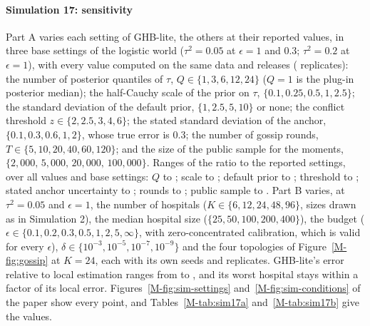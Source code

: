 \documentclass[acmsmall,screen,nonacm]{acmart}
\theoremstyle{acmdefinition}
\begin{document}
\paragraph{Simulation 17: sensitivity} Part A varies each setting of GHB-lite, the others at their reported values, in three base settings of the logistic world ($\tau^2=0.05$ at $\epsilon=1$ and $0.3$; $\tau^2=0.2$ at $\epsilon=1$), with every value computed on the same data and releases (\SimSeventeenReps{} replicates): the number of posterior quantiles of $\tau$, $Q\in\{1,3,6,12,24\}$ ($Q=1$ is the plug-in posterior median); the half-Cauchy scale of the prior on $\tau$, $\{0.1,0.25,0.5,1,2.5\}$; the standard deviation of the default prior, $\{1,2.5,5,10\}$ or none; the conflict threshold $z\in\{2,2.5,3,4,6\}$; the stated standard deviation of the anchor, $\{0.1,0.3,0.6,1,2\}$, whose true error is 0.3; the number of gossip rounds, $T\in\{5,10,20,40,60,120\}$; and the size of the public sample for the moments, $\{2{,}000,\,5{,}000,\,20{,}000,\,100{,}000\}$. Ranges of the ratio to the reported settings, over all values and base settings: $Q$ \SimSeventeenQMin{} to \SimSeventeenQMax; scale \SimSeventeenScaleMin{} to \SimSeventeenScaleMax; default prior \SimSeventeenPriorMin{} to \SimSeventeenPriorMax; threshold \SimSeventeenZMin{} to \SimSeventeenZMax; stated anchor uncertainty \SimSeventeenAnchorSdMin{} to \SimSeventeenAnchorSdMax; rounds \SimSeventeenTMin{} to \SimSeventeenTMax; public sample \SimSeventeenMMin{} to \SimSeventeenMMax. Part B varies, at $\tau^2=0.05$ and $\epsilon=1$, the number of hospitals ($K\in\{6,12,24,48,96\}$, sizes drawn as in Simulation 2), the median hospital size ($\{25,50,100,200,400\}$), the budget ($\epsilon\in\{0.1,0.2,0.3,0.5,1,2,5,\infty\}$, with zero-concentrated calibration, which is valid for every $\epsilon$), $\delta\in\{10^{-3},10^{-5},10^{-7},10^{-9}\}$ and the four topologies of Figure~\ref{M-fig:gossip} at $K=24$, each with its own seeds and \SimSeventeenReps{} replicates. GHB-lite's error relative to local estimation ranges from \SimSeventeenRelMin{} to \SimSeventeenRelMax, and its worst hospital stays within a factor \SimSeventeenWorstMax{} of its local error. Figures~\ref{M-fig:sim-settings} and~\ref{M-fig:sim-conditions} of the paper show every point, and Tables~\ref{M-tab:sim17a} and~\ref{M-tab:sim17b} give the values.
\end{document}
